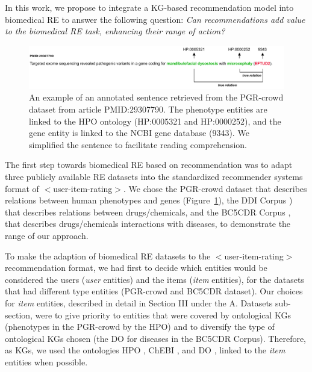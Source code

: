 In this work, we propose to integrate a KG-based recommendation model into biomedical RE to answer the following question: \textit{Can recommendations add value to the biomedical RE task, enhancing their range of action?} 

\begin{figure}[!h]
\centerline{\includegraphics[width=\linewidth]{images/chapter_4/example_paper_knowledge_graph.pdf}}
\caption[Example of an Annotated Sentence]{An example of an annotated sentence retrieved from the PGR-crowd dataset from article PMID:29307790. The phenotype entities are linked to the HPO ontology (HP:0005321 and HP:0000252), and the gene entity is linked to the NCBI gene database (9343). We simplified the sentence to facilitate reading comprehension.}
\label{fig:example}
\end{figure}

The first step towards biomedical RE based on recommendation was to adapt three publicly available RE datasets into the standardized recommender systems format of $<$user-item-rating$>$. We chose the PGR-crowd \citep{sousa2020hybrid} dataset that describes relations between human phenotypes and genes (Figure~\ref{fig:example}), the DDI Corpus \citep{herrero2013ddi}) that describes relations between drugs/chemicals, and the BC5CDR Corpus \citep{li2016biocreative}, that describes drugs/chemicals interactions with diseases, to demonstrate the range of our approach.

To make the adaption of biomedical RE datasets to the $<$user-item-rating$>$ recommendation format, we had first to decide which entities would be considered the users (\textit{user} entities) and the items (\textit{item} entities), for the datasets that had different type entities (PGR-crowd and BC5CDR dataset). Our choices for \textit{item} entities, described in detail in Section III under the A. Datasets sub-section, were to give priority to entities that were covered by ontological KGs (phenotypes in the PGR-crowd by the HPO) and to diversify the type of ontological KGs chosen (the DO for diseases in the BC5CDR Corpus). Therefore, as KGs, we used the ontologies HPO \citep{kohler2019expansion}, ChEBI \citep{hastings2012chebi}, and DO \citep{schriml2012disease}, linked to the \textit{item} entities when possible. 

